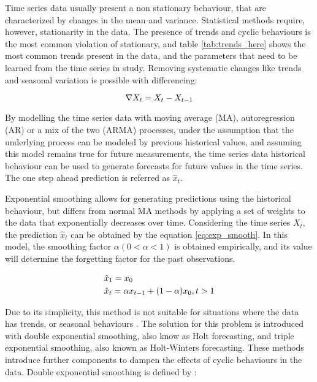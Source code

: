 \par Time series data usually present a non stationary behaviour, that are characterized by changes in the mean and variance. Statistical methods require, however,
stationarity in the data. The presence of trends and cyclic behaviours is the most common violation of stationary, and table \ref{tab:trends_here} shows the most 
common trends present in the data, and the parameters that need to be learned from the time series in study. Removing systematic changes like trends and seasonal 
variation is possible with differencing:

\begin {equation*}
\centering
\nabla X_t = X_t - X_{t-1}
\end {equation*}

\par By modelling the time series data with moving average (MA), autoregression (AR) or a mix of the two (ARMA) processes, under the assumption that the underlying
process can be modeled by previous historical values, and assuming this model remains true for future measurements, the time series data historical behaviour can
be used to generate forecasts for future values in the time series. The one step ahead prediction is referred as $\hat{x}_t$.

\par Exponential smoothing allows for generating predictions using the historical behaviour, but differs from normal MA methods by applying a set of weights to the
data that exponentially decreases over time. Considering the time series $X_t$, the prediction $\hat{x}_t$ can be obtained by the equation \ref{eq:exp_smooth}. 
In this model, the smoothing factor $\alpha (0 < \alpha < 1)$ is obtained empirically, and its value will determine the forgetting factor for the past observations.

\begin {equation*}
\centering
\begin {split}
&\hat{x}_1 = x_0 \\
&\hat{x}_t = \alpha x_{t-1} + (1-\alpha)x_0, t > 1
\end {split}
\label{eq:exp_smooth}
\end {equation*}

\par Due to its simplicity, this method is not suitable for situations where the data has trends, or seasonal behaviours \cite{kalekar_time_2004}. The solution for
this problem is introduced with double exponential smoothing, also know as Holt forecasting, and triple exponential smoothing, also known as Holt-Winters
forecasting. These methods introduce further components to dampen the effects of cyclic behaviours in the data. Double exponential smoothing is defined by
\cite{munz_traffic_2010} :

